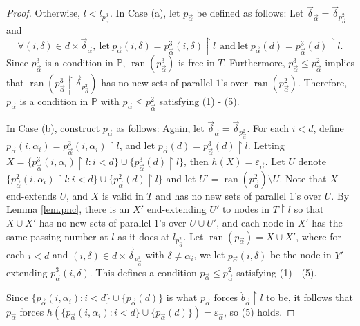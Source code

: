 \documentclass{amsart}
\theoremstyle{remark}
\theoremstyle{definition}
\theoremstyle{remark}
\newcommand{\al}{\alpha}
\DeclareMathOperator{\ran}{ran}
\newcommand{\re}{\restriction}
\newcommand{\bP}{\mathbb{P}}
\begin{document}
\begin{proof}
Otherwise,  $l<l_{p^3_{\vec\al}}$.
In Case (a),  let
$p_{\vec\al}$ be  defined as follows:
Let  $\vec\delta_{\vec\al}=\vec\delta_{p_{\vec\al}^2}$ and
 \begin{equation}
\forall (i,\delta)\in d\times\vec\delta_{\vec\al}, \mathrm{\ let\ }
p_{\vec\al}(i,\delta)=p^3_{\vec\al}(i,\delta)\re l\mathrm{\ \ and\  let\  }
p_{\vec\al}(d)=p^3_{\vec\al}(d)\re l.
\end{equation}
Since $p^3_{\vec\al}$ is a condition in $\bP$,
$\ran(p^3_{\vec\al})$ is free in $T$.
Furthermore, $p^3_{\vec\al}\le p^2_{\vec\al}$
implies that $\ran(p_{\vec\al}^3\re \vec\delta_{p^2_{\vec\al}})$ has no new sets of parallel $1$'s over $\ran(p^2_{\vec\al})$.
Therefore,
$p_{\vec\al}$ is a condition in $\bP$ with   $p_{\vec\al}\le p_{\vec\al}^2$ satisfying  (1) - (5).




In Case (b),
  construct $p_{\vec\al}$ as follows:
Again, let
 $\vec{\delta}_{\vec\al}=\vec\delta_{p^2_{\vec\al}}$.
For each $i<d$, define
$p_{\vec\al}(i,\al_i)=p^3_{\vec\al}(i,\al_i)\re l$,
and  let
$p_{\vec\al}(d)=p^3_{\vec\al}(d)\re l$.
Letting $X=\{p^3_{\vec\al}(i,\al_i)\re l:i<d\}\cup\{p^3_{\vec\al}(d)\re l\}$,   then 
  $h(X)=\varepsilon_{\vec\al}$.
Let $U$ denote 
$\{p^2_{\vec\al}(i,\al_i)\re l:i<d\}\cup\{p^2_{\vec\al}(d)\re l\}$
and
let $U'=\ran (p_{\vec\al}^2)\setminus U$.
Note that $X$ end-extends $U$,  and $X$ is valid  in $T$ and has no new sets of parallel $1$'s over $U$.
By Lemma
\ref {lem.pnc},
there is an $X'$ end-extending $U'$ to nodes in $T\re l$ so that  
$X\cup X'$ 
has no new sets of parallel $1$'s  over $U\cup U'$, and 
each node in $X'$ has the same passing  number at $l$ as it does at $l_{p_{\vec\al}^2}$.
Let $\ran(p_{\vec\al})= X\cup X'$,
where
 for each $i<d$
and $(i,\delta)\in d\times\vec{\delta}_{p_{\vec\al}^3}$ with $\delta\ne\al_i$,
we
let $p_{\vec\al}(i,\delta)$ be the node in $Y'$ extending
 $p_{\vec\al}^3(i,\delta)$.
 This defines a condition $p_{\vec\al}\le p_{\vec\al}^2$
  satisfying  (1) - (5).





Since $\{p_{\vec\al}(i,\al_i):i<d\}\cup\{p_{\vec\al}(d)\}$ is what $p_{\vec\al}$ forces $\dot{b}_{\vec\al}\re l$ to be,
it follows that
$p_{\vec\al}$ forces
 $h(\{p_{\vec\al}(i,\al_i):i<d\}\cup\{p_{\vec\al}(d)\})=\varepsilon_{\vec\al}$, so (5) holds.





\end{proof}
\end{document}
